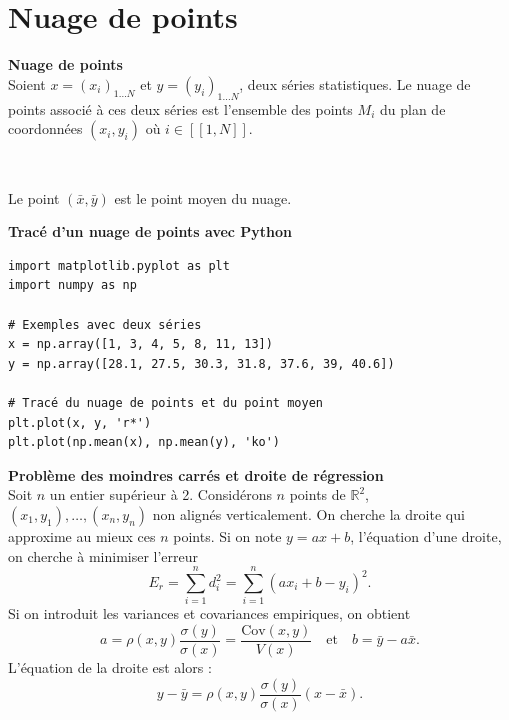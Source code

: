 \documentclass[../PolyS4.tex]{subfiles}
\begin{document}
\section{Nuage de points}

\begin{Def}\textbf{Nuage de points}\\

Soient $x = (x_i)_{1 \ldots N}$ et $y = (y_i)_{1 \ldots N}$, deux séries statistiques. Le nuage de points associé à ces deux séries est l'ensemble des points $M_i$ du plan de coordonnées $(x_i, y_i)$ où $i \in [[1, N]]$.
\end{Def}

\begin{Rmq}$\,$

Le point $(\bar{x}, \bar{y})$ est le point moyen du nuage.
\end{Rmq}

\begin{Meth}\textbf{Tracé d'un nuage de points avec Python}\\

\begin{verbatim}
import matplotlib.pyplot as plt
import numpy as np

# Exemples avec deux séries
x = np.array([1, 3, 4, 5, 8, 11, 13])
y = np.array([28.1, 27.5, 30.3, 31.8, 37.6, 39, 40.6])

# Tracé du nuage de points et du point moyen
plt.plot(x, y, 'r*')
plt.plot(np.mean(x), np.mean(y), 'ko')
\end{verbatim}
\end{Meth}

\begin{Prop}\textbf{Problème des moindres carrés et droite de régression}\\

Soit $n$ un entier supérieur à 2. Considérons $n$ points de $\mathbb{R}^2$, $(x_1, y_1), \ldots, (x_n, y_n)$ non alignés verticalement. On cherche la droite qui \og  approxime \fg{}  au mieux ces $n$ points. Si on note $y = ax + b$, l'équation d'une droite, on cherche à minimiser l'erreur
\[
E_r = \sum_{i=1}^{n} d_i^2 = \sum_{i=1}^{n} (ax_i + b - y_i)^2.
\]
Si on introduit les variances et covariances empiriques, on obtient
\[
a = \rho(x, y) \frac{\sigma(y)}{\sigma(x)}=\frac{\text{Cov}(x,y)}{V(x)} \quad \text{et} \quad b = \bar{y} - a \bar{x}.
\]
L'équation de la droite est alors :
\[
y - \bar{y} = \rho(x, y) \frac{\sigma(y)}{\sigma(x)} (x - \bar{x}).
\]
\end{Prop}
\end{document}
